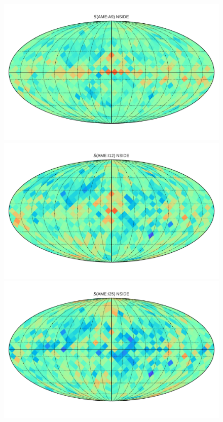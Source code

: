 {\begin{figure}
      \includegraphics[width=\textwidth/3]{../Plots/Allsky_Corr/RadNorm/Spearman_Map_nside8_AMEtoA9.pdf}
      \includegraphics[width=\textwidth/3]{../Plots/Allsky_Corr/RadNorm/Spearman_Map_nside8_AMEtoI12.pdf}
      \includegraphics[width=\textwidth/3]{../Plots/Allsky_Corr/RadNorm/Spearman_Map_nside8_AMEtoI25.pdf}

\end{figure}}
